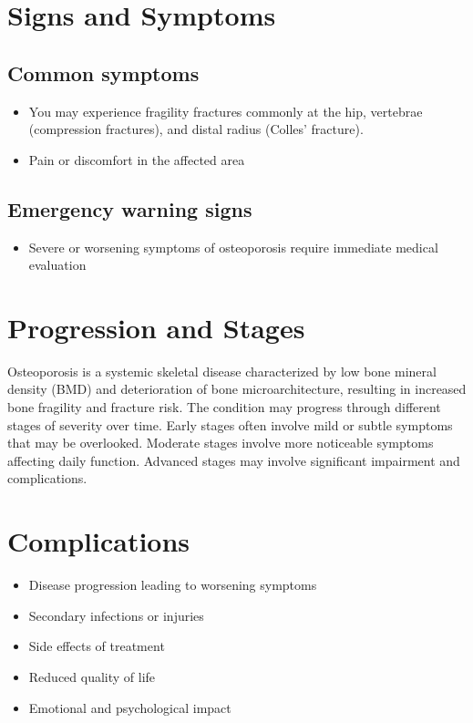 \section{Signs and Symptoms}

\subsection{Common symptoms}
\begin{itemize}[noitemsep]
  \item You may experience fragility fractures commonly at the hip, vertebrae (compression fractures), and distal radius (Colles' fracture).

  \item Pain or discomfort in the affected area
  \end{itemize}

\subsection{Emergency warning signs}
\begin{itemize}[noitemsep]
  \item Severe or worsening symptoms of osteoporosis require immediate medical evaluation
\end{itemize}
\section{Progression and Stages}
Osteoporosis is a systemic skeletal disease characterized by low bone mineral density (BMD) and deterioration of bone microarchitecture, resulting in increased bone fragility and fracture risk. The condition may progress through different stages of severity over time. Early stages often involve mild or subtle symptoms that may be overlooked. Moderate stages involve more noticeable symptoms affecting daily function. Advanced stages may involve significant impairment and complications.
\section{Complications}
\begin{itemize}[noitemsep]
  \item Disease progression leading to worsening symptoms
  \item Secondary infections or injuries
  \item Side effects of treatment
  \item Reduced quality of life
  \item Emotional and psychological impact
\end{itemize}
